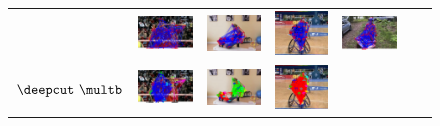 \begin{figure}
  \begin{tabular}{c c c c c c c}
    \toprule
    &
    \includegraphics[height=0.140\linewidth]{imgidx_0092_init_graph_mpii_multi.pdf}&
    \includegraphics[height=0.140\linewidth]{imgidx_1366_init_graph_mpii_multi.pdf}&
    \includegraphics[height=0.140\linewidth]{imgidx_0094_init_graph_mpii_multi.pdf}&
    \includegraphics[height=0.140\linewidth]{imgidx_0903_init_graph_mpii_multi.pdf}\\
    \begin{sideways}\bf\quad $\deepcut~\multb$\end{sideways}&    
    \includegraphics[height=0.140\linewidth]{imgidx_0092_graph_mpii_multi.pdf}&
    \includegraphics[height=0.140\linewidth]{imgidx_1366_graph_mpii_multi.pdf}&
    \includegraphics[height=0.140\linewidth]{imgidx_0094_graph_mpii_multi.pdf}&

\end{tabular}
\end{figure}
